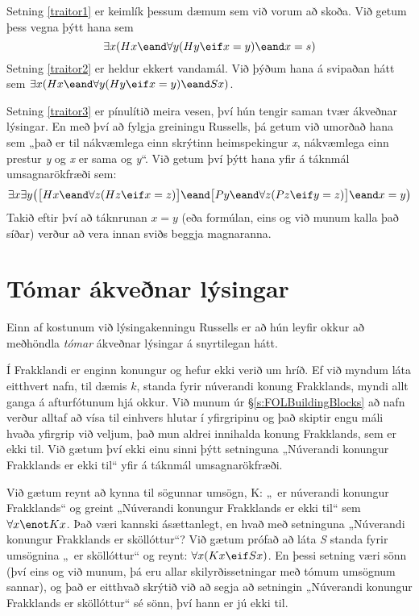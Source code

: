 Setning \ref{traitor1} er keimlík þessum dæmum sem við vorum að skoða. Við getum þess vegna þýtt hana sem $$\exists x (Hx \eand \forall y(Hy \eif x = y) \eand x = s)$$ Setning \ref{traitor2} er heldur ekkert vandamál. Við þýðum hana á svipaðan hátt sem $\exists x (Hx \eand \forall y(Hy \eif x = y) \eand Sx)$.

Setning \ref{traitor3} er pínulítið meira vesen, því hún tengir saman tvær ákveðnar lýsingar. En með því að fylgja greiningu Russells, þá getum við umorðað hana sem  „það er til nákvæmlega einn skrýtinn heimspekingur \emph{x}, nákvæmlega einn prestur \emph{y} og \emph{x} er sama og \emph{y}“. Við getum því þýtt hana yfir á táknmál umsagnarökfræði sem: 
$$\exists x \exists y \bigl(\bigl[Hx \eand \forall z(Hz \eif x = z)\bigr] \eand \bigl[Py \eand \forall z(Pz \eif y = z)\bigr] \eand x = y\bigr)$$
Takið eftir því að táknrunan $x = y$ (eða formúlan, eins og við munum kalla það síðar) verður að vera innan sviðs beggja magnaranna.

\section{Tómar ákveðnar lýsingar}

Einn af kostunum við lýsingakenningu Russells er að hún leyfir okkur að meðhöndla \emph{tómar} ákveðnar lýsingar á snyrtilegan hátt.

Í Frakklandi er enginn konungur og hefur ekki verið um hríð. Ef við myndum láta eitthvert nafn, til dæmis $k$, standa fyrir núverandi konung Frakklands, myndi allt ganga á afturfótunum hjá okkur. Við munum úr \S\ref{s:FOLBuildingBlocks} að nafn verður alltaf að vísa til einhvers hlutar í yfirgripinu og það skiptir engu máli hvaða yfirgrip við veljum, það mun aldrei innihalda konung Frakklands, sem er ekki til. Við gætum því ekki einu sinni þýtt setninguna „Núverandi konungur Frakklands er ekki til“ yfir á táknmál umsagnarökfræði.

Við gætum reynt að kynna til sögunnar umsögn, K: „\blank\ er núverandi konungur Frakklands“ og greint „Núverandi konungur Frakklands er ekki til“ sem $\forall x\enot Kx$. Það væri kannski ásættanlegt, en hvað með setninguna „Núverandi konungur Frakklands er sköllóttur“? Við gætum prófað að láta \emph{S} standa fyrir umsögnina „\blank\ er sköllóttur“ og reynt: $\forall x (Kx \eif Sx)$. En þessi setning væri sönn (því eins og við munum, þá eru allar skilyrðissetningar með tómum umsögnum sannar), og það er eitthvað skrýtið við að segja að setningin „Núverandi konungur Frakklands er sköllóttur“ sé sönn, því hann er jú ekki til.

